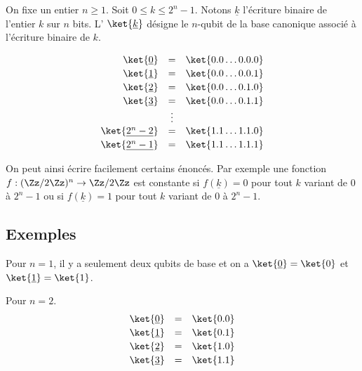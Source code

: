 \documentclass[11pt,class=report,crop=false]{standalone}
\begin{document}
On fixe un entier $n\ge1$. Soit $0 \le k \le 2^{n}-1$. 
Notons $\underline{k}$ l'écriture binaire de l'entier $k$ sur $n$ bits.
L' $\ket{\underline{k}}$ désigne le $n$-qubit de la base canonique associé à l'écriture binaire de $k$.

$$\begin{array}{rcl}
\ket{\underline{0}} &=& \ket{0.0\ldots0.0.0} \\[2pt]
\ket{\underline{1}} &=& \ket{0.0\ldots0.0.1} \\[2pt]
\ket{\underline{2}} &=& \ket{0.0\ldots0.1.0} \\[2pt]
\ket{\underline{3}} &=& \ket{0.0\ldots0.1.1} \\
& \vdots &  \\
\ket{\underline{2^{n}-2}} &=& \ket{1.1\ldots1.1.0} \\[2pt]
\ket{\underline{2^{n}-1}} &=& \ket{1.1\ldots1.1.1} \\
\end{array}
$$

\medskip

On peut ainsi écrire facilement certains énoncés. Par exemple une fonction
$f : (\Zz/2\Zz)^n \to \Zz/2\Zz$ est constante si
$f(\underline{k})=0$ pour tout $k$ variant de $0$ à $2^n-1$
ou si $f(\underline{k})=1$ pour tout $k$ variant de $0$ à $2^n-1$.
\subsection{Exemples}

Pour $n=1$, il y a seulement deux qubits de base et on a 
$\ket{\underline{0}} = \ket{0}$ et $\ket{\underline{1}} = \ket{1}$.

\begin{exemple}
Pour $n = 2$.
$$\begin{array}{rcl}
\ket{\underline{0}} &=& \ket{0.0} \\[2pt]
\ket{\underline{1}} &=& \ket{0.1} \\[2pt]
\ket{\underline{2}} &=& \ket{1.0} \\[2pt]
\ket{\underline{3}} &=& \ket{1.1} \\
\end{array}
$$
\end{exemple}
\end{document}
